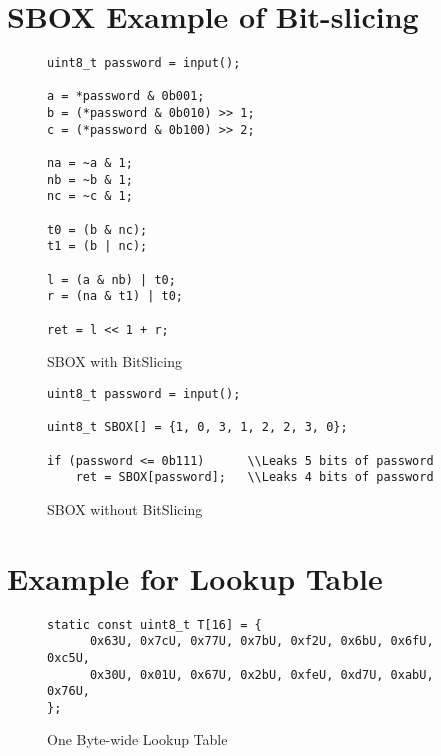 \clearpage
\section{SBOX Example of Bit-slicing}
\label{appendix:SBOX}

\begin{figure}[h!]
    \centering
    \begin{lstlisting}[xleftmargin=.02\textwidth,xrightmargin=.01\textwidth]
uint8_t password = input();

a = *password & 0b001;
b = (*password & 0b010) >> 1;
c = (*password & 0b100) >> 2;

na = ~a & 1;
nb = ~b & 1;
nc = ~c & 1;

t0 = (b & nc);
t1 = (b | nc);

l = (a & nb) | t0;
r = (na & t1) | t0;

ret = l << 1 + r;
      \end{lstlisting}
    \caption{SBOX with BitSlicing}
    \label{fig:SBOX_bitslicing}
\end{figure}

\begin{figure}[h!]
    \centering
    \begin{lstlisting}[xleftmargin=.02\textwidth,xrightmargin=.01\textwidth]
uint8_t password = input();

uint8_t SBOX[] = {1, 0, 3, 1, 2, 2, 3, 0};

if (password <= 0b111)      \\Leaks 5 bits of password
    ret = SBOX[password];   \\Leaks 4 bits of password
      \end{lstlisting}
    \caption{SBOX without BitSlicing}
    \label{fig:SBOX_da}
\end{figure}

\section{Example for Lookup Table}

\begin{figure}[h!]
    \centering
    \begin{lstlisting}[xleftmargin=.02\textwidth,xrightmargin=.01\textwidth]
static const uint8_t T[16] = {
      0x63U, 0x7cU, 0x77U, 0x7bU, 0xf2U, 0x6bU, 0x6fU, 0xc5U,
      0x30U, 0x01U, 0x67U, 0x2bU, 0xfeU, 0xd7U, 0xabU, 0x76U,
};
      \end{lstlisting}
    \caption{One Byte-wide Lookup Table}
    \label{fig:one_byte_table}
\end{figure}

